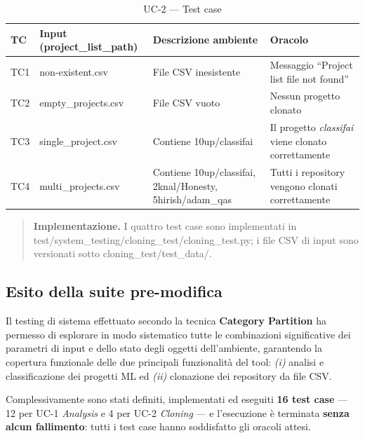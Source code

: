 \documentclass[11pt,a4paper]{article}
\makeatletter
\newif\ifmark@prevlower
\def\mark@casebreak#1{%
  \ifcat\noexpand#1\relax
    \mark@prevlowerfalse
  \else
    \ifnum`#1=\uccode`#1\relax
      \ifmark@prevlower\allowbreak\fi
      \mark@prevlowerfalse
    \else
      \ifnum`#1=\lccode`#1\relax
        \mark@prevlowertrue
      \else
        \mark@prevlowerfalse
      \fi
    \fi
  \fi}
\def\mark@brk#1{%
  \ifx#1\mark@stop
    \let\mark@next\relax
  \else
    \mark@casebreak{#1}%
    #1%
    \ifx#1.\allowbreak\else
      \ifx#1\_\allowbreak\else
        \ifx#1/\allowbreak\else
          \ifx#1(\allowbreak\fi
        \fi
      \fi
    \fi
    \let\mark@next\mark@brk
  \fi
  \mark@next}
\def\mark@stop{\mark@stop}
\DeclareRobustCommand{\mark@code}[1]{%
  \ifmmode
    \text{\ttfamily\small\mark@prevlowerfalse\mark@brk#1\mark@stop}%
  \else
    {\ttfamily\small\mark@prevlowerfalse\mark@brk#1\mark@stop}%
  \fi}
\DeclareRobustCommand{\code}[1]{\mark@code{#1}}
\DeclareRobustCommand{\pkgpath}[1]{\mark@code{#1}}
\DeclareRobustCommand{\file}[1]{\mark@code{#1}}
\DeclareRobustCommand{\flag}[1]{\mark@code{#1}}
\def\mark@code#1{#1}%
\def\code#1{#1}%
\def\pkgpath#1{#1}%
\def\file#1{#1}%
\def\flag#1{#1}%
\newcommand{\thead}[1]{\textbf{#1}}
\newenvironment{keypoints}
  {\begin{quote}\small}
  {\end{quote}}
\makeatother
\begin{document}
\begin{table}[H]
  \centering\small
  \caption{UC-2 --- Test case}
  \label{tab:uc2-tc}
  \begin{tabularx}{\linewidth}{@{}L{1.3cm} L{3.4cm} L{4.0cm} Y@{}}
    \toprule
    \thead{TC} & \thead{Input (\flag{project\_list\_path})} &
    \thead{Descrizione ambiente} & \thead{Oracolo}\\
    \midrule
    TC1 & \file{non-existent.csv} & File CSV inesistente &
      Messaggio ``Project list file not found''\\
    TC2 & \file{empty\_projects.csv} & File CSV vuoto &
      Nessun progetto clonato\\
    TC3 & \file{single\_project.csv} & Contiene \code{10up/classifai} &
      Il progetto \emph{classifai} viene clonato correttamente\\
    TC4 & \file{multi\_projects.csv} &
      Contiene \code{10up/classifai}, \code{2knal/Honesty},
      \code{5hirish/adam\_qas} &
      Tutti i repository vengono clonati correttamente\\
    \bottomrule
  \end{tabularx}
\end{table}

\begin{keypoints}
\textbf{Implementazione.} I quattro test case sono implementati in
\file{test/system\_testing/cloning\_test/cloning\_test.py}; i file CSV di input
sono versionati sotto \pkgpath{cloning\_test/test\_data/}.
\end{keypoints}

\subsection{Esito della suite pre-modifica}
\label{sec:premod-esito}

Il testing di sistema effettuato secondo la tecnica \textbf{Category
Partition} ha permesso di esplorare in modo sistematico tutte le combinazioni
significative dei parametri di input e dello stato degli oggetti dell'ambiente,
garantendo la copertura funzionale delle due principali funzionalit\`a del tool:
\emph{(i)} analisi e classificazione dei progetti ML ed \emph{(ii)} clonazione
dei repository da file CSV.

Complessivamente sono stati definiti, implementati ed eseguiti \textbf{16 test
case} --- 12 per UC-1 \emph{Analysis} e 4 per UC-2 \emph{Cloning} --- e
l'esecuzione \`e terminata \textbf{senza alcun fallimento}: tutti i test case
hanno soddisfatto gli oracoli attesi.
\end{document}
